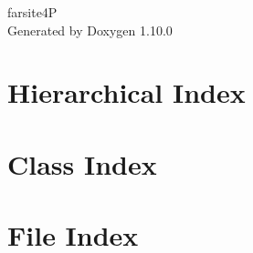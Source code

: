 \documentclass[twoside]{book}
\newcommand{\+}{\discretionary{\mbox{\scriptsize$\hookleftarrow$}}{}{}}
\newcommand{\clearemptydoublepage}{%
    \newpage{\pagestyle{empty}\cleardoublepage}%
  }
\begin{document}
  \raggedbottom
    \hypersetup{pageanchor=false,
                bookmarksnumbered=true,
                pdfencoding=unicode
               }
  \begin{titlepage}
  \vspace*{7cm}
  \begin{center}%
  {\Large farsite4P}\\
  \vspace*{1cm}
  {\large Generated by Doxygen 1.10.0}\\
  \end{center}
  \end{titlepage}
  \clearemptydoublepage
  \tableofcontents
  \clearemptydoublepage
  \hypersetup{pageanchor=true}



\chapter{Hierarchical Index}

\chapter{Class Index}

\chapter{File Index}

\end{document}
